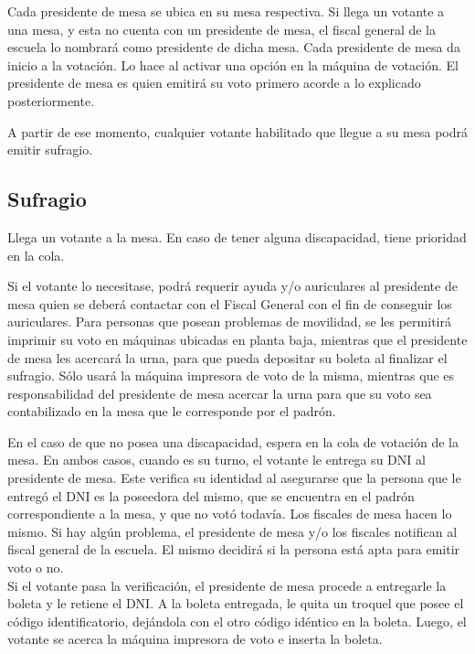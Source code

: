 Cada presidente de mesa se ubica en su mesa respectiva. Si llega un votante a una mesa, y esta no cuenta con un presidente de mesa, el fiscal general de la escuela lo nombrará como presidente de dicha mesa. Cada presidente de mesa da inicio a la votación. Lo hace al activar una opción en la máquina de votación. El presidente de mesa es quien emitirá su voto primero acorde a lo explicado posteriormente.

A partir de ese momento, cualquier votante habilitado que llegue a su mesa podrá emitir sufragio.\\


\subsection{Sufragio}

Llega un votante a la mesa. En caso de tener alguna discapacidad, tiene prioridad en la cola. 

Si el votante lo necesitase, podrá requerir ayuda y/o auriculares al presidente de mesa quien se deberá contactar con el Fiscal General con el fin de conseguir los auriculares. Para personas que posean problemas de movilidad, se les permitirá imprimir su voto en máquinas ubicadas en planta baja, mientras que el presidente de mesa les acercará la urna, para que pueda depositar su boleta al finalizar el sufragio. Sólo usará la máquina impresora de voto de la misma, mientras que es responsabilidad del presidente de mesa acercar la urna para que su voto sea contabilizado en la mesa que le corresponde por el padrón.

En el caso de que no posea una discapacidad, espera en la cola de votación de la mesa. 
En ambos casos, cuando es su turno, el votante le entrega su DNI al presidente de mesa. Este verifica su identidad al asegurarse que la persona que le entregó el DNI es la poseedora del mismo, que se encuentra en el padrón correspondiente a la mesa, y que no votó todavía. Los fiscales de mesa hacen lo mismo. Si hay algún problema, el presidente de mesa y/o los fiscales notifican al fiscal general de la escuela. El mismo decidirá si la persona está apta para emitir voto o no.\\

Si el votante pasa la verificación, el presidente de mesa procede a entregarle la boleta y le retiene el DNI. A la boleta entregada, le quita un troquel que posee el código identificatorio, dejándola con el otro código idéntico en la boleta.
Luego, el votante se acerca la máquina impresora de voto e inserta la boleta.\\


